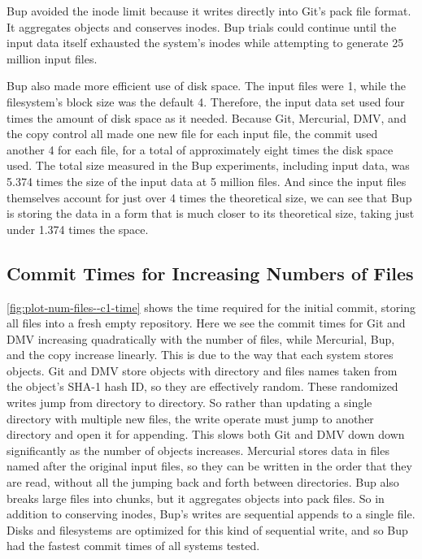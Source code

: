 Bup avoided the \gls{inode} limit because it writes directly into Git's pack file format.
It aggregates objects and conserves inodes.
Bup trials could continue until the input data itself exhausted the system's \glspl{inode} while attempting to generate \num{25} million input files.

Bup also made more efficient use of disk space.
The input files were \SI{1}{\kib}, while the filesystem's block size was the default \SI{4}{\kib}.
Therefore, the input data set used four times the amount of disk space as it needed.
Because Git, Mercurial, DMV, and the copy control all made one new file for each input file, the commit used another \SI{4}{\kib} for each file, for a total of approximately eight times the disk space used.
The total size measured in the Bup experiments, including input data, was \num{5.374} times the size of the input data at \num{5} million files.
And since the input files themselves account for just over \num{4} times the theoretical size, we can see that Bup is storing the data in a form that is much closer to its theoretical size, taking just under \num{1.374} times the space.

%


\subsection{Commit Times for Increasing Numbers of Files}

\autoref{fig:plot-num-files--c1-time} shows the time required for the initial \gls{commit}, storing all files into a fresh empty \gls{repository}.
Here we see the commit times for Git and DMV increasing quadratically with the number of files, while Mercurial, Bup, and the copy increase linearly.
This is due to the way that each system stores objects.
Git and DMV store objects with directory and files names taken from the object's SHA-1 hash ID, so they are effectively random.
These randomized writes jump from directory to directory.
So rather than updating a single directory with multiple new files, the write operate must jump to another directory and open it for appending.
This slows both Git and DMV down down significantly as the number of objects increases.
Mercurial stores data in files named after the original input files, so they can be written in the order that they are read, without all the jumping back and forth between directories.
Bup also breaks large files into chunks, but it aggregates objects into pack files.
So in addition to conserving inodes, Bup's writes are sequential appends to a single file.
Disks and filesystems are optimized for this kind of sequential write, and so Bup had the fastest commit times of all systems tested.


